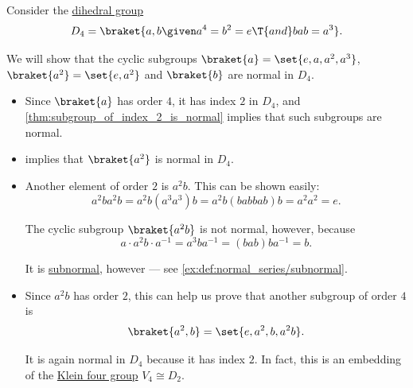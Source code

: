 \begin{example}\label{ex:d2_normal_subgroups}
  Consider the \hyperref[def:dihedral_group]{dihedral group}
  \begin{equation*}
    D_4 = \braket{ a, b \given a^4 = b^2 = e \T{and} bab = a^3 }.
  \end{equation*}

  We will show that the cyclic subgroups \( \braket{ a } = \set{ e, a, a^2, a^3 } \), \( \braket{ a^2 } = \set{ e, a^2 } \) and \( \braket{ b } \) are normal in \( D_4 \).

  \begin{itemize}
    \item Since \( \braket{ a } \) has order \( 4 \), it has index \( 2 \) in \( D_4 \), and \cref{thm:subgroup_of_index_2_is_normal} implies that such subgroups are normal.

    \item {} implies that \( \braket{ a^2 } \) is normal in \( D_4 \).

    \item Another element of order \( 2 \) is \( a^2 b \). This can be shown easily:
    \begin{equation*}
      a^2 b a^2 b = a^2 b (a^3 a^3) b = a^2 b (bab bab) b = a^2 a^2 = e.
    \end{equation*}

    The cyclic subgroup \( \braket{ a^2 b } \) is not normal, however, because
    \begin{equation*}
      a \cdot a^2 b \cdot a^{-1} = a^3 b a^{-1} = (bab) b a^{-1} = b.
    \end{equation*}

    It is \hyperref[def:subnormal_group]{subnormal}, however --- see \cref{ex:def:normal_series/subnormal}.

    \item Since \( a^2 b \) has order \( 2 \), this can help us prove that another subgroup of order \( 4 \) is
    \begin{equation*}
      \braket{ a^2, b } = \set{ e, a^2, b, a^2 b }.
    \end{equation*}

    It is again normal in \( D_4 \) because it has index \( 2 \). In fact, this is an embedding of the \hyperref[def:klein_four_group]{Klein four group} \( V_4 \cong D_2 \).
  \end{itemize}
\end{example}

